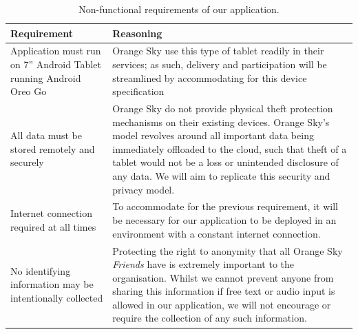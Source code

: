 \begin{table}[h]
    \centering
    \begin{tabularx}{\textwidth}{ >{\hsize}Y | >{\hsize}Y }
        \hline
        Requirement                                                       & Reasoning                                                                                                                                                                                                                                                                                                                                 \\ [0.5ex]
        \hline
        Application must run on 7” Android Tablet running Android Oreo Go & Orange Sky use this type of tablet readily in their services; as such, delivery and participation will be streamlined by accommodating for this device specification                                                                                                                                                                      \\
        All data must be stored remotely and securely                     & Orange Sky do not provide physical theft protection mechanisms on their existing devices. Orange Sky's model revolves around all important data being immediately offloaded to the cloud, such that theft of a tablet would not be a loss or unintended disclosure of any data. We will aim to replicate this security and privacy model. \\
        Internet connection required at all times                         & To accommodate for the previous requirement, it will be necessary for our application to be deployed in an environment with a constant internet connection.                                                                                                                                                                               \\
        No identifying information may be intentionally collected         & Protecting the right to anonymity that all Orange Sky \emph{Friends} have is extremely important to the organisation. Whilst we cannot prevent anyone from sharing this information if free text or audio input is allowed in our application, we will not encourage or require the collection of any such information.                   \\
        \hline
    \end{tabularx}
    \caption{Non-functional requirements of our application.}
    \label{nonfunctionalreqs}
\end{table}


